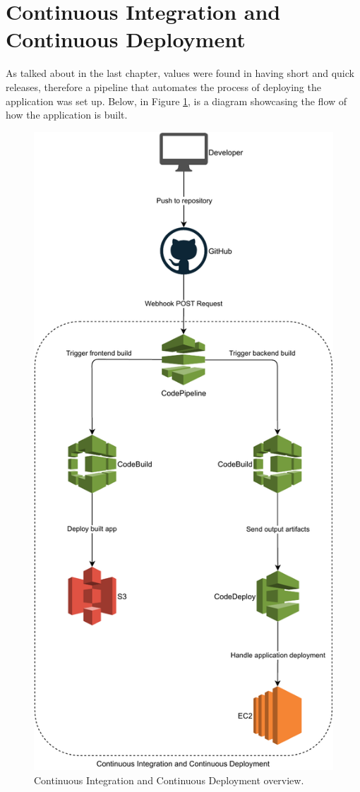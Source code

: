 \section{Continuous Integration and Continuous Deployment}

As talked about in the last chapter, values were found in having short and quick releases, therefore a pipeline that automates the process of deploying the application was set up. Below, in Figure \ref{figure:cicd}, is a diagram showcasing the flow of how the application is built.

\begin{figure}[H]
	\centering
	\includegraphics[width=.7\textwidth,keepaspectratio]{images/architecture/cicd.pdf}
	\caption{Continuous Integration and Continuous Deployment overview.}
	\label{figure:cicd}
\end{figure}

